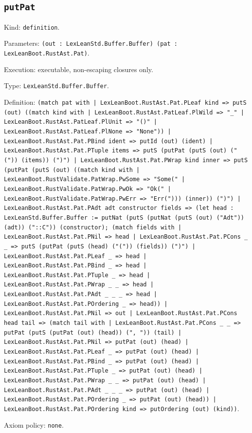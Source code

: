 \documentclass[11pt]{article}
\begin{document}
\subsection*{\texttt{putPat}}
\noindent Kind: \texttt{definition}.\par
\noindent Parameters: \texttt{(out : LexLeanStd.Buffer.Buffer) (pat : LexLeanBoot.RustAst.Pat)}.\par
\noindent Execution: executable, non-escaping closures only.\par
\noindent Type: \texttt{LexLeanStd.Buffer.Buffer}.\par
\noindent Definition: \texttt{(match pat with | LexLeanBoot.RustAst.Pat.PLeaf kind => putS (out) ((match kind with | LexLeanBoot.RustAst.PatLeaf.PlWild => "\_" | LexLeanBoot.RustAst.PatLeaf.PlUnit => "()" | LexLeanBoot.RustAst.PatLeaf.PlNone => "None")) | LexLeanBoot.RustAst.Pat.PBind ident => putId (out) (ident) | LexLeanBoot.RustAst.Pat.PTuple items => putS (putPat (putS (out) ("(")) (items)) (")") | LexLeanBoot.RustAst.Pat.PWrap kind inner => putS (putPat (putS (out) ((match kind with | LexLeanBoot.RustValidate.PatWrap.PwSome => "Some(" | LexLeanBoot.RustValidate.PatWrap.PwOk => "Ok(" | LexLeanBoot.RustValidate.PatWrap.PwErr => "Err("))) (inner)) (")") | LexLeanBoot.RustAst.Pat.PAdt adt constructor fields => (let head : LexLeanStd.Buffer.Buffer := putNat (putS (putNat (putS (out) ("Adt")) (adt)) ("::C")) (constructor); (match fields with | LexLeanBoot.RustAst.Pat.PNil => head | LexLeanBoot.RustAst.Pat.PCons \_ \_ => putS (putPat (putS (head) ("(")) (fields)) (")") | LexLeanBoot.RustAst.Pat.PLeaf \_ => head | LexLeanBoot.RustAst.Pat.PBind \_ => head | LexLeanBoot.RustAst.Pat.PTuple \_ => head | LexLeanBoot.RustAst.Pat.PWrap \_ \_ => head | LexLeanBoot.RustAst.Pat.PAdt \_ \_ \_ => head | LexLeanBoot.RustAst.Pat.POrdering \_ => head)) | LexLeanBoot.RustAst.Pat.PNil => out | LexLeanBoot.RustAst.Pat.PCons head tail => (match tail with | LexLeanBoot.RustAst.Pat.PCons \_ \_ => putPat (putS (putPat (out) (head)) (", ")) (tail) | LexLeanBoot.RustAst.Pat.PNil => putPat (out) (head) | LexLeanBoot.RustAst.Pat.PLeaf \_ => putPat (out) (head) | LexLeanBoot.RustAst.Pat.PBind \_ => putPat (out) (head) | LexLeanBoot.RustAst.Pat.PTuple \_ => putPat (out) (head) | LexLeanBoot.RustAst.Pat.PWrap \_ \_ => putPat (out) (head) | LexLeanBoot.RustAst.Pat.PAdt \_ \_ \_ => putPat (out) (head) | LexLeanBoot.RustAst.Pat.POrdering \_ => putPat (out) (head)) | LexLeanBoot.RustAst.Pat.POrdering kind => putOrdering (out) (kind))}.\par
\noindent Axiom policy: \texttt{none}.\par
\end{document}
